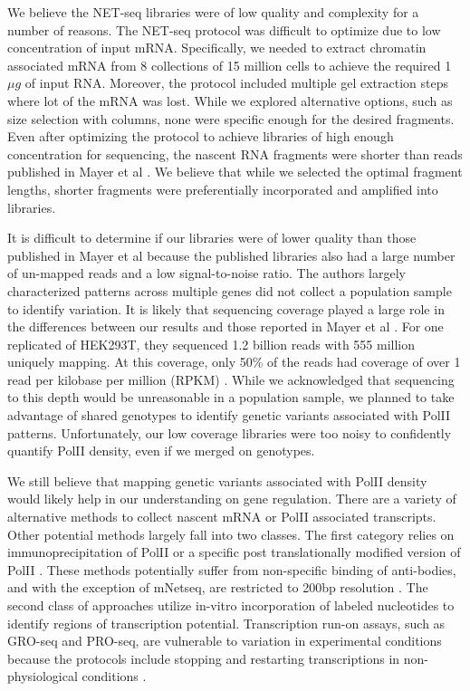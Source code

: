 We believe the NET-seq libraries were of low quality and complexity for a number of reasons. The NET-seq protocol was difficult to optimize due to low concentration of input mRNA. Specifically, we needed to extract chromatin associated mRNA from 8 collections of 15 million cells to achieve the required 1$\mu g$ of input RNA. Moreover, the protocol included multiple gel extraction steps where lot of the mRNA was lost. While we explored alternative options, such as size selection with columns, none were specific enough for the desired fragments. Even after optimizing the protocol to achieve libraries of high enough concentration for sequencing, the nascent RNA fragments were shorter than reads published in Mayer et al \cite{mayer_native_2015}. We believe that while we selected the optimal fragment lengths, shorter fragments were preferentially incorporated and amplified into libraries. 

It is difficult to determine if our libraries were of lower quality than those published in Mayer et al because the published libraries also had a large number of un-mapped reads and a low signal-to-noise ratio. The authors largely characterized patterns across multiple genes did not collect a population sample to identify variation. It is likely that sequencing coverage played a large role in the differences between our results and those reported in Mayer et al \cite{mayer_native_2015}. For one replicated of HEK293T, they sequenced 1.2 billion reads with 555 million uniquely mapping. At this coverage, only 50\% of the reads had coverage of over 1 read per kilobase per million (RPKM) \cite{mayer_native_2015}. While we acknowledged that sequencing to this depth would be unreasonable in a population sample, we planned to take advantage of shared genotypes to identify genetic variants associated with PolII patterns. Unfortunately, our low coverage libraries were too noisy to confidently quantify PolII density, even if we merged on genotypes. 

We still believe that mapping genetic variants associated with PolII density would likely help in our understanding on gene regulation. There are a variety of alternative methods to collect nascent mRNA or PolII associated transcripts. Other potential methods largely fall into two classes. The first category relies on immunoprecipitation of PolII or a specific post translationally modified version of PolII \citep{nojima_mammalian_2015, gariglio_clustering_1981, buck_chip-chip_2004, kim_high-resolution_2005,wissink_nascent_2019, mayer_pause_2017}. These methods potentially suffer from non-specific binding of anti-bodies, and with the exception of mNetseq, are restricted to 200bp resolution \citep{nojima_mammalian_2015}. The second class of approaches utilize in-vitro incorporation of labeled nucleotides to identify regions of transcription potential. Transcription run-on assays, such as GRO-seq and PRO-seq, are vulnerable to variation in experimental conditions because the protocols include stopping and restarting transcriptions in non-physiological conditions \citep{kwak_precise_2013,core_analysis_2014, tome_single-molecule_2018, gardini_global_2017,mahat_base-pair-resolution_2016, mayer_pause_2017, wissink_nascent_2019}. 


